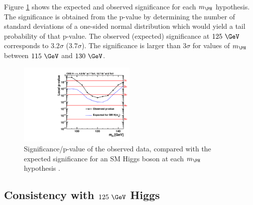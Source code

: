Figure \ref{fig:results-pvalue} shows the expected and observed significance for
each $m_{\PH}$ hypothesis. The significance is obtained from the p-value by
determining the number of standard deviations of a one-sided normal distribution
which would yield a tail probability of that p-value. The observed (expected)
significance at $125~\GeV$ corresponds to $3.2\sigma$ ($3.7\sigma$). The
significance is larger than $3\sigma$ for values of $m_{\PH}$ between $115~\GeV$
and $130~\GeV$.

\begin{figure}[h!]
\includegraphics[width=0.5\textwidth]{plots/htt-sm/cmb_p-value.pdf}
\caption[Significance/p-value of the observed data, compared with the expected
significance for an SM Higgs boson at each $m_{\PH}$ hypothesis.]
{Significance/p-value of the observed data, compared with the expected
significance for an SM Higgs boson at each $m_{\PH}$ hypothesis
\cite{HIG-13-004}.}
\label{fig:results-pvalue}
\end{figure}

\subsection{Consistency with $125~\GeV$ Higgs}
\label{sec:consistency}

